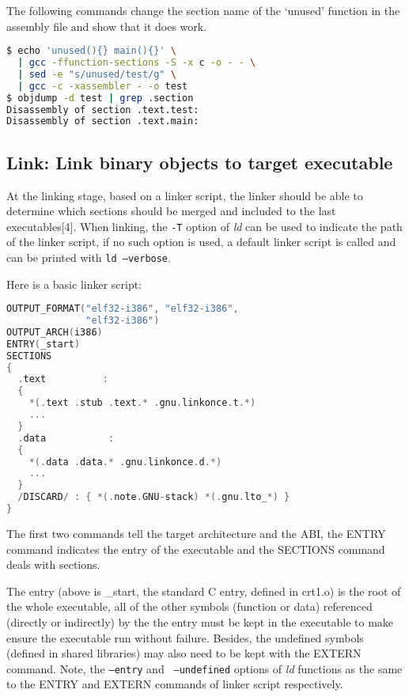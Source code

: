 \documentclass[10pt,a4paper]{article}
\begin{document}
\begin{multicols}{2}
The following commands change the section name of the `unused' function in the
assembly file and show that it does work.

\begin{lstlisting}[language=bash,
                  commentstyle=\fontsize{7}{8}\selectfont,
                  basicstyle=\ttfamily\fontsize{7}{8}\selectfont]
$ echo 'unused(){} main(){}' \
  | gcc -ffunction-sections -S -x c -o - - \
  | sed -e "s/unused/test/g" \
  | gcc -c -xassembler - -o test
$ objdump -d test | grep .section
Disassembly of section .text.test:
Disassembly of section .text.main:
\end{lstlisting}

\subsection{Link: Link binary objects to target executable}

At the linking stage, based on a linker script, the linker should be able to
determine which sections should be merged and included to the last executables[4].
When linking, the {\small {\tt -T}} option of {\em ld} can be used to indicate the
path of the linker script, if no such option is used, a default linker script
is called and can be printed with {\small {\tt ld --verbose}}.

Here is a basic linker script:

\begin{lstlisting}[language=c,
                  commentstyle=\fontsize{7}{8}\selectfont,
                  basicstyle=\ttfamily\fontsize{7}{8}\selectfont]
OUTPUT_FORMAT("elf32-i386", "elf32-i386",
              "elf32-i386")
OUTPUT_ARCH(i386)
ENTRY(_start)
SECTIONS
{
  .text          :
  {
    *(.text .stub .text.* .gnu.linkonce.t.*)
    ...
  }
  .data           :
  {
    *(.data .data.* .gnu.linkonce.d.*)
    ...
  }
  /DISCARD/ : { *(.note.GNU-stack) *(.gnu.lto_*) }
}
\end{lstlisting}

The first two commands tell the target architecture and the ABI, the ENTRY
command indicates the entry of the executable and the SECTIONS command deals
with sections.

The entry (above is \_start, the standard C entry, defined in crt1.o) is the
root of the whole executable, all of the other symbols (function or data)
referenced (directly or indirectly) by the the entry must be kept in the
executable to make ensure the executable run without failure.  Besides, the
undefined symbols (defined in shared libraries) may also need to be kept with
the EXTERN command. Note, the {\small {\tt --entry}} and {\small {\tt
--undefined}} options of {\em ld} functions as the same to the ENTRY and EXTERN
commands of linker script respectively.


\end{multicols}
\end{document}
